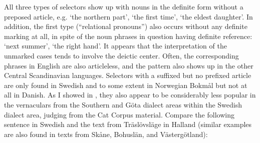 
All three types of selectors show up with nouns in the definite form without a preposed article, e.g.  ‘the northern part’,  ‘the first time’,  ‘the eldest daughter’. In addition, the first type (“relational pronouns”) also occurs without any definite marking at all, in spite of the noun phrases in question having definite reference:  ‘next summer’,  ‘the right hand’. It appears that the interpretation of the unmarked cases tends to involve the deictic center. Often, the corresponding phrases in English are also articleless, and the pattern also shows up in the other Central Scandinavian languages. Selectors with a suffixed but no prefixed article are only found in Swedish and to some extent in Norwegian Bokmål but not at all in Danish. As I showed in \citet{Dahl2003}, they also appear to be considerably less popular in the vernaculars from the Southern and Göta dialect areas within the Swedish dialect area, judging from the Cat Corpus material. Compare the following sentence in Swedish and the text from Träslövsläge in Halland (similar examples are also found in texts from Skåne, Bohuslän, and Västergötland):


\ea\label{}
\z
\z 

